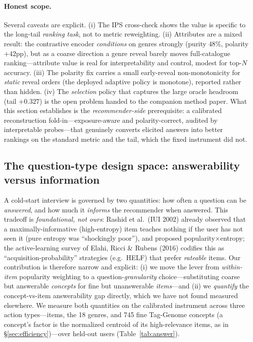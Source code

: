 \documentclass[11pt]{article}
\begin{document}
\paragraph{Honest scope.} Several caveats are explicit. (i) The IPS cross-check shows the value is specific to the
long-tail \emph{ranking task}, not to metric reweighting. (ii) Attributes are a mixed result: the contrastive encoder
\emph{conditions} on genres strongly (purity $48\%$, polarity $+42$pp), but as a coarse direction a genre reveal barely
moves full-catalogue ranking---attribute value is real for interpretability and control, modest for top-$N$ accuracy.
(iii) The polarity fix carries a small early-reveal non-monotonicity for \emph{static} reveal orders (the deployed
adaptive policy is monotone), reported rather than hidden. (iv) The \emph{selection} policy that captures the large
oracle headroom (tail $+0.327$) is the open problem handed to the companion method paper. What this section establishes
is the \emph{recommender-side} prerequisite: a calibrated reconstruction fold-in---exposure-aware and polarity-correct,
audited by interpretable probes---that genuinely converts elicited answers into better rankings on the standard metric
and the tail, which the fixed instrument did not.

\subsection{The question-type design space: answerability versus information}\label{sec:answerability}
A cold-start interview is governed by two quantities: how often a question can be \emph{answered}, and how much it
\emph{informs} the recommender when answered. This tradeoff is \emph{foundational, not ours}: Rashid et al.\ (IUI
2002) already observed that a maximally-informative (high-entropy) item teaches nothing if the user has not seen it
(pure entropy was ``shockingly poor''), and proposed popularity$\times$entropy; the active-learning survey of Elahi,
Ricci \& Rubens (2016) codifies this as ``acquisition-probability'' strategies (e.g.\ HELF) that prefer
\emph{rateable} items. Our contribution is therefore narrow and explicit: (i) we move the lever from \emph{within-item}
popularity weighting to a question-\emph{granularity} choice---substituting coarse but answerable \emph{concepts} for
fine but unanswerable \emph{items}---and (ii) we \emph{quantify} the concept-vs-item answerability gap directly, which
we have not found measured elsewhere. We measure both quantities on the calibrated instrument across three action
types---items, the 18 genres, and 745 fine Tag-Genome concepts (a concept's factor is the normalized centroid of its
high-relevance items, as in \S\ref{sec:efficiency})---over held-out users (Table~\ref{tab:answer}).
\end{document}
